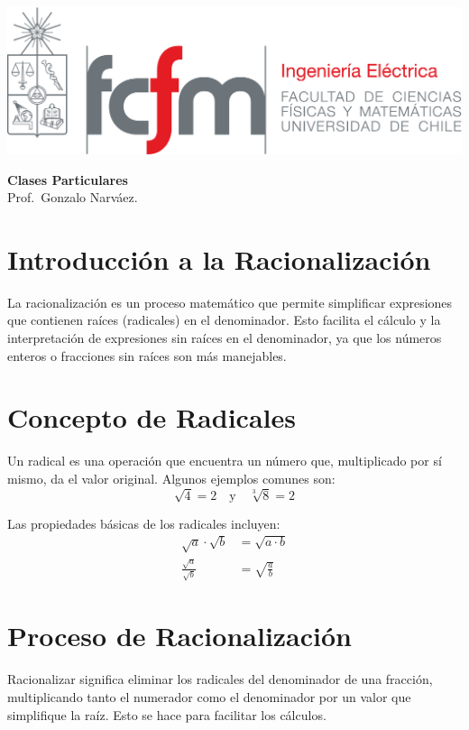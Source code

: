\documentclass[
  11pt,
  letterpaper,
  answers
]{exam}
\begin{document}
\begin{minipage}{0.42\textwidth}
    \includegraphics[width=\textwidth]{../fcfm_die}
\end{minipage}
\begin{minipage}{0.53\textwidth}
\begin{center} 
\large\textbf{Clases Particulares} \\
\normalsize Prof.~Gonzalo Narváez.
\end{center}
\end{minipage}

\vspace{0.5cm}
\noindent



\section{Introducción a la Racionalización}
La racionalización es un proceso matemático que permite simplificar expresiones que contienen raíces (radicales) en el denominador. Esto facilita el cálculo y la interpretación de expresiones sin raíces en el denominador, ya que los números enteros o fracciones sin raíces son más manejables.

\section{Concepto de Radicales}
Un radical es una operación que encuentra un número que, multiplicado por sí mismo, da el valor original. Algunos ejemplos comunes son:
\[
\sqrt{4} = 2 \quad \text{y} \quad \sqrt[3]{8} = 2
\]

Las propiedades básicas de los radicales incluyen:
\begin{align*}
\sqrt{a} \cdot \sqrt{b} &= \sqrt{a \cdot b} \\
\frac{\sqrt{a}}{\sqrt{b}} &= \sqrt{\frac{a}{b}}
\end{align*}

\section{Proceso de Racionalización}
Racionalizar significa eliminar los radicales del denominador de una fracción, multiplicando tanto el numerador como el denominador por un valor que simplifique la raíz. Esto se hace para facilitar los cálculos.
\end{document}
